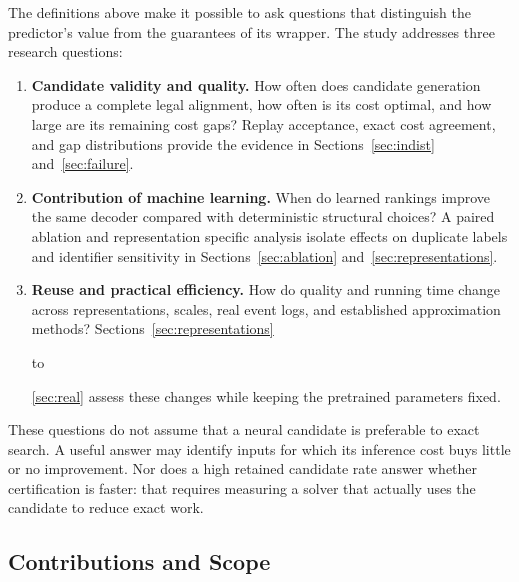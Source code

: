 The definitions above make it possible to ask questions that distinguish the predictor's value from the guarantees of its wrapper. The study addresses three research questions:
\begin{enumerate}[label=\textbf{RQ\arabic*.},leftmargin=*]
\item \textbf{Candidate validity and quality.} How often does candidate generation produce a complete legal alignment, how often is its cost optimal, and how large are its remaining cost gaps? Replay acceptance, exact cost agreement, and gap distributions provide the evidence in Sections~\ref{sec:indist} and~\ref{sec:failure}.
\item \textbf{Contribution of machine learning.} When do learned rankings improve the same decoder compared with deterministic structural choices? A paired ablation and representation specific analysis isolate effects on duplicate labels and identifier sensitivity in Sections~\ref{sec:ablation} and~\ref{sec:representations}.
\item \textbf{Reuse and practical efficiency.} How do quality and running time change across representations, scales, real event logs, and established approximation methods? Sections~\ref{sec:representations}\begin{revised} to \end{revised}\ref{sec:real} assess these changes while keeping the pretrained parameters fixed.
\end{enumerate}
These questions do not assume that a neural candidate is preferable to exact search. A useful answer may identify inputs for which its inference cost buys little or no improvement. Nor does a high retained candidate rate answer whether certification is faster: that requires measuring a solver that actually uses the candidate to reduce exact work.

\subsection{Contributions and Scope}
\label{sec:contributions}

